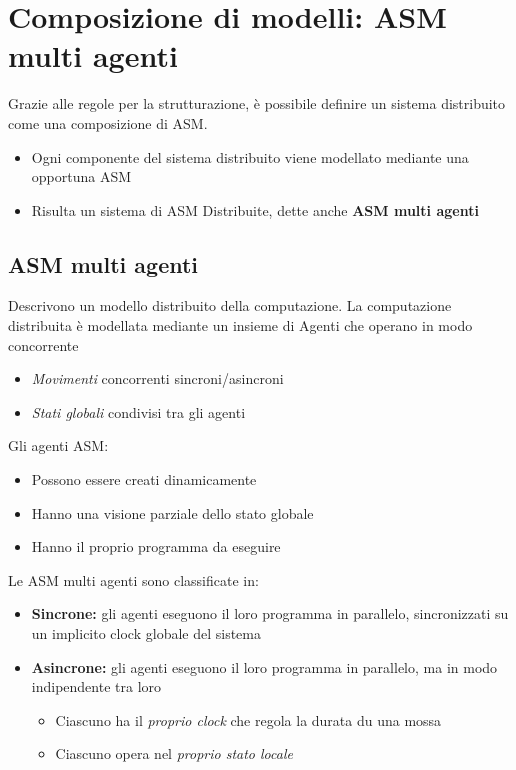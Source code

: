 \chapter{Composizione di modelli: ASM multi agenti}
\noindent Grazie alle regole per la strutturazione, è possibile definire un sistema distribuito
come una composizione di ASM.
\begin{itemize}
    \item Ogni componente del sistema distribuito viene
    modellato mediante una opportuna ASM
    \item Risulta un sistema di ASM Distribuite, dette anche \textbf{ASM multi agenti}
\end{itemize}

\section{ASM multi agenti}
\noindent Descrivono un modello distribuito della computazione. La computazione distribuita è modellata
mediante un insieme di Agenti che operano in modo concorrente
\begin{itemize}
    \item \textit{Movimenti} concorrenti sincroni/asincroni
    \item \textit{Stati globali} condivisi tra gli agenti
\end{itemize}

\noindent Gli agenti ASM:
\begin{itemize}
    \item Possono essere creati dinamicamente
    \item Hanno una visione parziale dello stato globale
    \item Hanno il proprio programma da eseguire
\end{itemize}

\noindent Le ASM multi agenti sono classificate in:
\begin{itemize}
    \item \textbf{Sincrone:} gli agenti eseguono il loro programma in parallelo, sincronizzati su un implicito clock globale del sistema
    \item \textbf{Asincrone:} gli agenti eseguono il loro programma in parallelo, ma in modo indipendente tra loro 
    \begin{itemize}
        \item Ciascuno ha il \textit{proprio clock} che regola la durata du una mossa
        \item Ciascuno opera nel \textit{proprio stato locale}
    \end{itemize}
\end{itemize}

